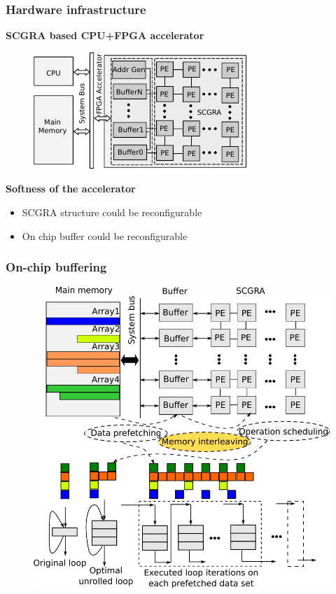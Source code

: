 \documentclass{beamer}
\begin{document}
\begin{frame}[t]
\frametitle{Hardware infrastructure} 
\textbf{SCGRA based CPU+FPGA accelerator}
\begin{figure}
\includegraphics[width=0.65\linewidth]{scgra-acceleratorv2}
\end{figure}

\textbf{Softness of the accelerator}
\begin{itemize}
\item SCGRA structure could be reconfigurable
\item On chip buffer could be reconfigurable
\end{itemize}
\end{frame}

\begin{frame}[t]
\frametitle{On-chip buffering}

\begin{figure}
\vspace{-1em}
\includegraphics[width=0.7\linewidth]{on-chip-buffer}
\end{figure}

\end{frame}
\end{document}
